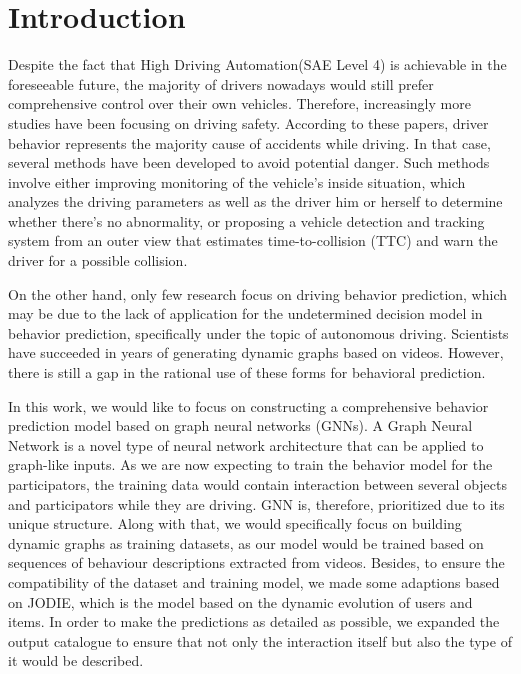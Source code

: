 
\chapter{Introduction}\label{chapter:introduction}
Despite the fact that High Driving Automation(SAE Level 4) is achievable in the foreseeable future\cite{inagaki2019critique}, the majority of drivers nowadays would still prefer comprehensive control over their own vehicles. Therefore, increasingly more studies have been focusing on driving safety\cite{lee2005driving}\cite{lee2008fifty}. 
According to these papers, driver behavior represents the majority cause of accidents while driving. In that case, several methods have been developed to avoid potential danger. Such methods involve either improving monitoring of the vehicle's inside situation, which analyzes the driving parameters as well as the driver him or herself to determine whether there's no abnormality\cite{karrouchi2023driving}, or proposing a vehicle detection and tracking system from an outer view that estimates time-to-collision (TTC) and warn the driver for a possible collision\cite{aytekin2010increasing}.

On the other hand, only few research focus on driving behavior prediction, which may be due to the lack of application for the undetermined decision model in behavior prediction, specifically under the topic of autonomous driving. Scientists have succeeded in years of generating dynamic graphs based on videos. However, there is still a gap in the rational use of these forms for behavioral prediction.

In this work, we would like to focus on constructing a comprehensive behavior prediction model based on graph neural networks (GNNs). A Graph Neural Network is a novel type of neural network architecture that can be applied to graph-like inputs. As we are now expecting to train the behavior model for the participators, the training data would contain interaction between several objects and participators while they are driving. GNN is, therefore, prioritized due to its unique structure. Along with that, we would specifically focus on building dynamic graphs as training datasets, as our model would be trained based on sequences of behaviour descriptions extracted from videos.
Besides, to ensure the compatibility of the dataset and training model, we made some adaptions based on JODIE\cite{kumar2019predicting}, which is the model based on the dynamic evolution of users and items. In order to make the predictions as detailed as possible, we expanded the output catalogue to ensure that not only the interaction itself but also the type of it would be described.

